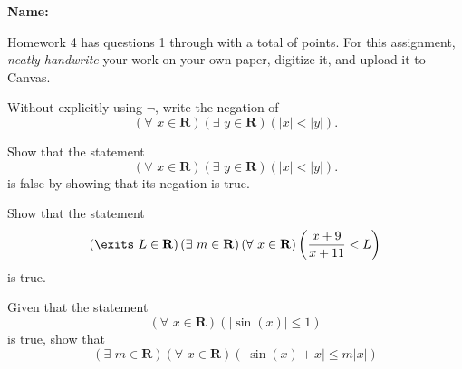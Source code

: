 \documentclass[12pt,fleqn]{exam}
\newcommand{\reals}{\mathbf{R}}
\newcommand{\quiz}{4}
\newcommand{\term}{Spring}
\begin{document}
\large
\vspace{0.1in}
\noindent{}
{\bf Name:}  \\
\noindent \makebox[3.0truein][l]{\bf Homework   \quiz, \term \/ \the\year}
\vspace{0.1in}

\begin{quote}
    \end{quote}
\noindent  Homework    \quiz\/  has questions 1 through  \numquestions \/ with 
a total of  \numpoints\/  points. For this assignment, \emph{neatly handwrite} 
your work on your own paper, digitize it, and upload it to Canvas.


\vspace{0.1in}


\begin{questions} 

\question [5] Without explicitly using $\lnot$, write the negation of 
\begin{equation*}
    \left(\forall \,\, x \in \reals \right)
    \left(\exists \,\, y \in \reals \right)
    \left(|x| < |y| \right).
\end{equation*}

\question[5]  Show that the statement  
\begin{equation*}
    \left(\forall \,\, x \in \reals \right)
    \left(\exists \,\, y \in \reals \right)
    \left(|x| < |y| \right).
\end{equation*}
is false by showing that its negation is true.

\question [5] Show that the statement
\begin{equation*}
    \left(\exits \,\, L \in \reals \right)
     \left(\exists \,\, m \in \reals \right)
     \left(\forall \,\, x \in \reals \right)
     \left(\frac{x+9}{x+11} < L \right)
\end{equation*}
is true.
\begin{solution}

    
\end{solution}

\question [5]  Given that the statement
\begin{equation*}
    \left(\forall \,\, x \in \reals \right)
    \left(|\sin(x)| \leq 1 \right)
\end{equation*}
is true, show that
\begin{equation*}
    \left(\exists \,\, m \in \reals \right)
    \left(\forall \,\, x \in \reals \right)
    \left(|\sin(x) + x | \leq m |x| \right)
\end{equation*}
\begin{solution}

    
\end{solution}
\end{questions}
\end{document}
